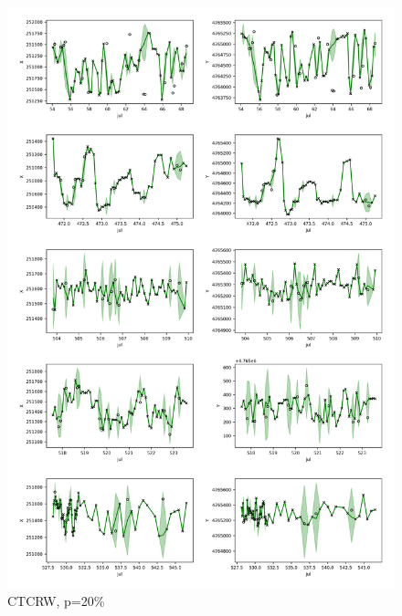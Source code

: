 \documentclass[11pt]{article}
\begin{document}
\begin{figure}[h]
  \centering
  \includegraphics[width=\textwidth]{../figure/20_5094_crawl} %
  \caption{CTCRW, p=20\%}
  \label{fig: ctcrw_20} %
\end{figure}
\end{document}
